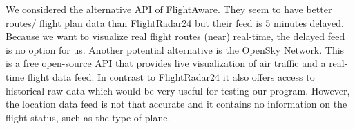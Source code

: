 We considered the alternative API of FlightAware. They seem to have better routes/ flight plan data than FlightRadar24 but their feed is 5 minutes delayed. Because we want to visualize real flight routes (near) real-time, the delayed feed is no option for us. Another potential alternative is the OpenSky Network. This is a free open-source API that provides live visualization of air traffic and a real-time flight data feed. In contrast to FlightRadar24 it also offers access to historical raw data which would be very useful for testing our program. However, the location data feed is not that accurate and it contains no information on the flight status, such as the type of plane.
